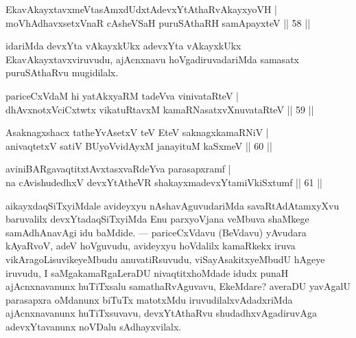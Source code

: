 \begin{shl}
EkavAkayxtavxmeVtasAmxdUdxtAdevxYtAthaRvAkayxyoVH |\\
moVhAdhavxsetxVnaR cAsheVSaH puruSAthaRH samApayxteV \hfill || 58 ||
\end{shl}

\begin{artha}
idariMda devxYta vAkayxkUkx adevxYta vAkayxkUkx EkavAkayxtavxviruvudu, ajAcnxnavu hoVgadiruvadariMda samasatx puruSAthaRvu mugidilalx.
\end{artha}

\begin{shl}
\footnotemark{}pariceCxVdaM hi yatAkxyaRM tadeVva vinivataRteV |\\
dhAvxnotxVciCxtwtx vikatuRtavxM kamaRNasatxvXnuvataRteV \hfill || 59 ||
\end{shl}

\begin{shl}
Asaknagxshacx tatheYvA\s \s setxV \footnotemark{}teV EteV saknagxkamaRNiV |\\
anivaqtetxV satiV BUyoV\s vidAyxM janayituM kaSxmeV \hfill || 60 ||
\end{shl}

\begin{shl}
aviniBARgavaqtitxtAvxtasxvaRdeYva parasapxramf |\\
\footnotemark{}na cAvishudedhxV devxYtAtheVR shakayxmadevxYtamiVkiSxtumf \hfill || 61 ||
\end{shl}

\begin{artha}
aikayxdaqSiTxyiMdale avideyxyu nAshavAguvudariMda savaRtAdAtamxyXvu baruvalilx devxYtadaqSiTxyiMda Enu parxyoVjana veMbuva shaMkege samAdhAnavAgi idu baMdide. --- pariceCxVdavu (BeVdavu) yAvudara kAyaRvoV, adeV hoVguvudu, avideyxyu hoVdalilx kamaRkekx iruva vikAragoLisuvikeyeMbudu anuvatiRsuvudu, viSayAsakitxyeMbudU hAgeye iruvudu, I saMgakamaRgaLeraDU nivaqtitxhoMdade idudx punaH ajAcnxnavanunx huTiTxsalu samathaRvAguvavu, EkeMdare? averaDU yavAgalU parasapxra oMdanunx biTuTx matotxMdu iruvudilalxvAdadxriMda ajAcnxnavanunx huTiTxsuvavu, devxYtAthaRvu shudadhxvAgadiruvAga adevxYtavanunx noVDalu sAdhayxvilalx.
\end{artha}


